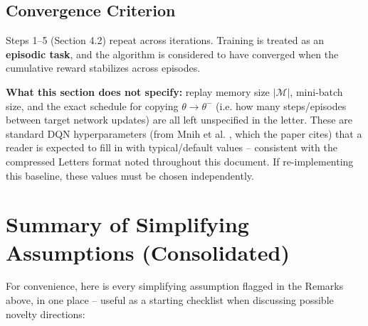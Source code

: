 \documentclass[11pt]{article}
\begin{document}
\subsection{Convergence Criterion}
Steps 1--5 (Section 4.2) repeat across iterations. Training is treated as an
\textbf{episodic task}, and the algorithm is considered to have converged when the
cumulative reward stabilizes across episodes.

\begin{remark}
\textbf{What this section does not specify:} replay memory size $|\mathcal{M}|$,
mini-batch size, and the exact schedule for copying $\theta \to \theta^-$ (i.e. how many
steps/episodes between target network updates) are all left unspecified in the letter.
These are standard DQN hyperparameters (from Mnih et al. \cite{mnih2015}, which the
paper cites) that a reader is expected to fill in with typical/default values --
consistent with the compressed Letters format noted throughout this document. If
re-implementing this baseline, these values must be chosen independently.
\end{remark}

\section*{Summary of Simplifying Assumptions (Consolidated)}

For convenience, here is every simplifying assumption flagged in the Remarks above, in
one place -- useful as a starting checklist when discussing possible novelty directions:
\end{document}
